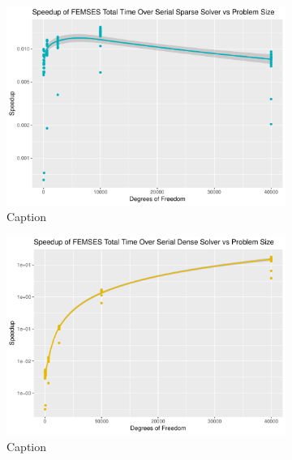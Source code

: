 \begin{figure}
	\centering
	\begin{subfigure}{0.48\linewidth}
		\centering
		\includegraphics[width = \linewidth]{Plots/total_femses_cpu_sparse_speedup_vs_n}
		\caption{Caption}
		\label{fig:tot_femses_sparse}
	\end{subfigure}\hfill
	\begin{subfigure}{0.48\linewidth}
		\centering
		\includegraphics[width=\linewidth]{Plots/total_femses_cpu_dense_speedup_vs_n}
		\caption{Caption}
		\label{fig:tot_femses_dense}
	\end{subfigure}\\
	\begin{subfigure}{0.48\linewidth}
		\centering

\end{subfigure}
\end{figure}
